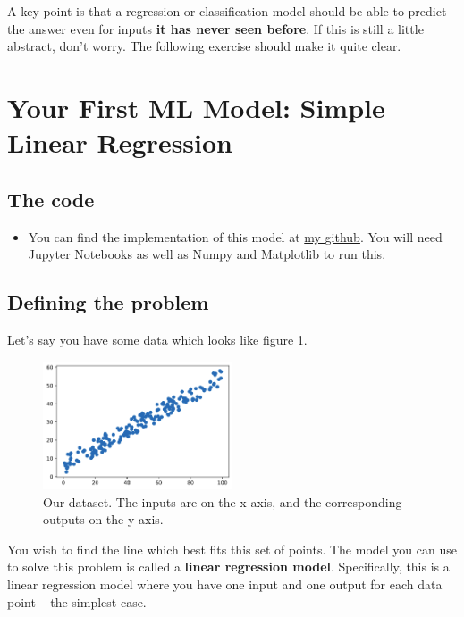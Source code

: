 \documentclass{article}
\begin{document}
        A key point is that a regression or classification model should be able to predict the answer
        even for inputs \textbf{it has never seen before}. If this is still a little abstract,
        don't worry. The following exercise should make it quite clear.
    \newpage
    \section{Your First ML Model: Simple Linear Regression}
        \subsection{The code}
            \begin{itemize}
                \item You can find the implementation of this model at \href{https://github.com/aniruddhkb/enigmatutorials/blob/master/intro2ml/linearRegression.ipynb}{my github}.
                You will need Jupyter Notebooks as well as Numpy and Matplotlib to run this.
            \end{itemize}
        \subsection{Defining the problem}
            Let's say you have some data which looks like figure 1.
            \begin{figure}[h] \begin{center}
                \includegraphics[width = 0.5\textwidth]{plot1.png}
                \caption{Our dataset. The inputs are on the x axis, and the corresponding outputs on the y axis.}
            \end{center} \end{figure}

            You wish to find the line which best fits this set of points.
            The model you can use to solve this problem is called a \textbf{linear regression model}.
            Specifically, this is a linear regression model where you have one input and one output
            for each data point -- the simplest case.
\end{document}

